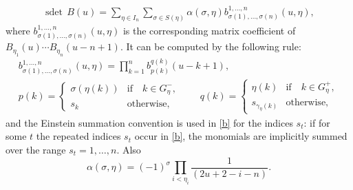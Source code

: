   \begin{theorem}\label{sdet}
\begin{gather*}%
\operatorname{sdet}\, B(u)=
\sum_{ \eta\in I_n } \sum_{\sigma\in S(\eta)}  \alpha(\sigma, \eta)
b^{1,\dots , n}_{\sigma(1),\dots, \sigma(n)}(u,\eta),
\end{gather*}
where $b^{1,\dots ,n}_{\sigma(1),\dots , \sigma(n)}(u,\eta)$ is the corresponding matrix coefficient of   $B_{\eta_1}(u) \cdots B_{\eta_n}(u-n+1)$. It can be computed by the following rule:
 \begin{gather}\label{b}
b^{1,\dots ,n}_{\sigma(1),\dots, \sigma(n)}(u,\eta)=
   \prod_{k=1}^{n}
b_{p(k)}^{q(k)}(u-k+1),\\
 p{(k)}=
\begin{cases}
\sigma(\eta(k))  &  \text{if}\quad k\in G_\eta^ -,\\
s_k& \text{otherwise},
\end{cases}
\qquad
q{(k)}=
\begin{cases}
\eta(k)  &\text{if}\quad
k\in G_\eta^+ ,\\
s_{\gamma_\eta(k)}&\text{otherwise},
\end{cases}\nonumber
\end{gather}
 and  the Einstein summation convention is used in \eqref{b} for the indices $s_t$: if  for some $t$ the repeated indices $s_t$ occur in \eqref{b}, the monomials are implicitly summed over  the range $s_t=1,\dots, n$.
Also
\[
\alpha(\sigma, \eta)=(-1)^{\sigma}
\prod_{i<\eta_i} \frac{1}{(2u+2-i-n)}.
\]
\end{theorem}

